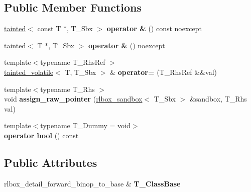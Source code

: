 \subsection*{Public Member Functions}
\begin{DoxyCompactItemize}
\item 
\mbox{\label{classrlbox_1_1tainted__volatile_a6cfb61db0c20522d8f9f33d111ae4d5c}} 
\hyperlink{classrlbox_1_1tainted}{tainted}$<$ const T $\ast$, T\+\_\+\+Sbx $>$ {\bfseries operator \&} () const noexcept
\item 
\mbox{\label{classrlbox_1_1tainted__volatile_ace5c231dd34dd457c5780711f659a262}} 
\hyperlink{classrlbox_1_1tainted}{tainted}$<$ T $\ast$, T\+\_\+\+Sbx $>$ {\bfseries operator \&} () noexcept
\item 
\mbox{\label{classrlbox_1_1tainted__volatile_a03de23a9e3db2a7ec1c392544c704988}} 
{\footnotesize template$<$typename T\+\_\+\+Rhs\+Ref $>$ }\\\hyperlink{classrlbox_1_1tainted__volatile}{tainted\+\_\+volatile}$<$ T, T\+\_\+\+Sbx $>$ \& {\bfseries operator=} (T\+\_\+\+Rhs\+Ref \&\&val)
\item 
\mbox{\label{classrlbox_1_1tainted__volatile_adc112be01be78aff6187e845e2e3ee5f}} 
{\footnotesize template$<$typename T\+\_\+\+Rhs $>$ }\\void {\bfseries assign\+\_\+raw\+\_\+pointer} (\hyperlink{classrlbox_1_1rlbox__sandbox}{rlbox\+\_\+sandbox}$<$ T\+\_\+\+Sbx $>$ \&sandbox, T\+\_\+\+Rhs val)
\item 
\mbox{\label{classrlbox_1_1tainted__volatile_ad6b318608ffa3306c230b8043b33091d}} 
{\footnotesize template$<$typename T\+\_\+\+Dummy  = void$>$ }\\{\bfseries operator bool} () const
\end{DoxyCompactItemize}
\subsection*{Public Attributes}
\begin{DoxyCompactItemize}
\item 
\mbox{\label{classrlbox_1_1tainted__volatile_a41f8c034554f4dff986b2209bdc45b4e}} 
rlbox\+\_\+detail\+\_\+forward\+\_\+binop\+\_\+to\+\_\+base \& {\bfseries T\+\_\+\+Class\+Base}
\end{DoxyCompactItemize}


